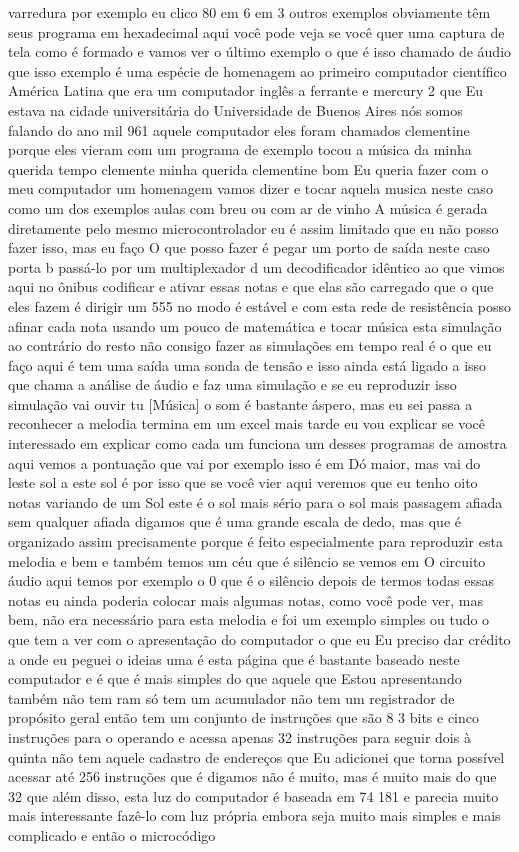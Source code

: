 \documentclass[oneside,11pt]{memoir} %
\begin{document}
varredura por exemplo eu clico 80  em 6 em 3  outros exemplos obviamente têm seus  programa em hexadecimal aqui você pode  veja se você quer uma captura de tela  como é formado  e vamos ver o último exemplo  o que é isso chamado de áudio que isso  exemplo é uma espécie de homenagem ao  primeiro computador científico  América Latina que era um computador  inglês a ferrante e mercury 2 que  Eu estava na cidade universitária do  Universidade de Buenos Aires nós somos  falando do ano mil 961 aquele computador  eles foram chamados clementine porque eles vieram  com um programa de exemplo  tocou a música da minha querida  tempo clemente minha querida clementine bom  Eu queria fazer com o meu computador um  homenagem vamos dizer e tocar aquela musica  neste caso como um dos exemplos  aulas com breu ou com ar de vinho  A música é gerada diretamente pelo  mesmo microcontrolador eu é assim  limitado que eu não posso fazer isso, mas eu faço  O que posso fazer é pegar um porto de  saída neste caso porta b passá-lo  por um multiplexador d um decodificador  idêntico ao que vimos aqui no ônibus  codificar e ativar essas notas e que elas são  carregado que o que eles fazem é dirigir um  555 no modo é estável e com esta rede  de resistência posso afinar cada nota  usando um pouco de matemática e  tocar música  esta simulação ao contrário do resto  não consigo fazer as simulações  em tempo real é o que eu faço aqui é  tem uma saída uma sonda de  tensão e isso ainda está ligado a isso que  chama a análise de áudio e faz uma  simulação e se eu reproduzir isso  simulação vai ouvir  tu  [Música]  o som é bastante áspero, mas eu sei  passa a reconhecer a melodia termina em um  excel mais tarde eu vou explicar se você  interessado em explicar como cada um funciona  um desses programas de amostra aqui  vemos a pontuação que vai por exemplo  isso é em Dó maior, mas vai do leste  sol a este sol é por isso que se você vier aqui veremos  que eu tenho oito notas variando de um  Sol  este é o sol mais sério para o sol mais  passagem afiada sem qualquer afiada  digamos que é uma grande escala de dedo, mas  que é organizado assim precisamente porque  é feito especialmente para reproduzir  esta melodia e bem e também temos  um céu que é silêncio se vemos em  O circuito  áudio aqui temos por exemplo  o 0 que é o silêncio depois de termos  todas essas notas eu ainda poderia colocar  mais algumas notas, como você pode ver, mas  bem, não era necessário para esta melodia e  foi um exemplo simples  ou tudo o que tem a ver com o  apresentação do computador o que eu  Eu preciso dar crédito a onde eu peguei o  ideias uma é esta página que é  bastante baseado neste computador e  é que é mais simples do que aquele que  Estou apresentando também não tem ram  só tem um acumulador não tem  um registrador de propósito geral então tem  um conjunto de instruções que são 8  3 bits e cinco instruções para o  operando e acessa apenas 32  instruções para seguir dois à quinta  não tem aquele cadastro de endereços que  Eu adicionei que torna possível acessar  até 256 instruções que é digamos  não é muito, mas é muito mais do que 32 que  além disso, esta luz do computador é baseada em  74 181 e parecia muito mais  interessante fazê-lo com luz própria  embora seja muito mais simples e mais  complicado e então o microcódigo  
\end{document}

